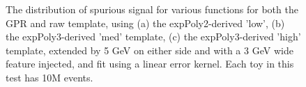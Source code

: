 \begin{figure} 
\begin{center}

\caption{The distribution of spurious signal for various functions for both the GPR and raw template, using (a) the expPoly2-derived 'low', (b) the expPoly3-derived 'med' template, (c) the expPoly3-derived 'high' template, extended by 5 GeV on either side and with a 3 GeV wide feature injected, and fit using a linear error kernel. Each toy in this test has 10M events.}
\label{fig:linearkernel_lowpt_10M_Sig_1s}
\end{center}
\end{figure}
				

